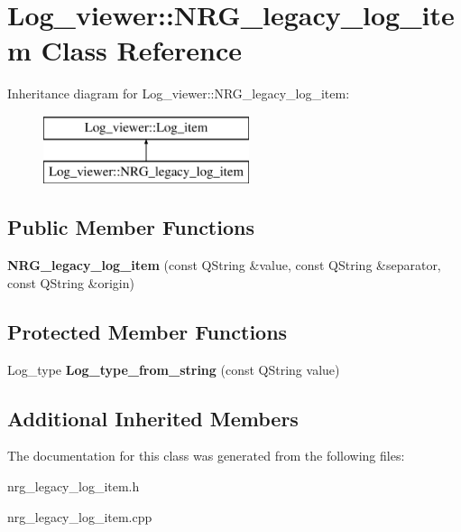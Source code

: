 \hypertarget{class_log__viewer_1_1_n_r_g__legacy__log__item}{\section{Log\-\_\-viewer\-:\-:N\-R\-G\-\_\-legacy\-\_\-log\-\_\-item Class Reference}
\label{class_log__viewer_1_1_n_r_g__legacy__log__item}
}
Inheritance diagram for Log\-\_\-viewer\-:\-:N\-R\-G\-\_\-legacy\-\_\-log\-\_\-item\-:\begin{figure}[H]
\begin{center}
\leavevmode
\includegraphics[height=2.000000cm]{class_log__viewer_1_1_n_r_g__legacy__log__item}
\end{center}
\end{figure}
\subsection*{Public Member Functions}
\begin{DoxyCompactItemize}
\item 
\hypertarget{class_log__viewer_1_1_n_r_g__legacy__log__item_a45bc36e7f11f11f7159f37008ff4791c}{{\bfseries N\-R\-G\-\_\-legacy\-\_\-log\-\_\-item} (const Q\-String \&value, const Q\-String \&separator, const Q\-String \&origin)}\label{class_log__viewer_1_1_n_r_g__legacy__log__item_a45bc36e7f11f11f7159f37008ff4791c}

\end{DoxyCompactItemize}
\subsection*{Protected Member Functions}
\begin{DoxyCompactItemize}
\item 
\hypertarget{class_log__viewer_1_1_n_r_g__legacy__log__item_a6485c7e03d5d0db58fddc76dbb5c190f}{Log\-\_\-type {\bfseries Log\-\_\-type\-\_\-from\-\_\-string} (const Q\-String value)}\label{class_log__viewer_1_1_n_r_g__legacy__log__item_a6485c7e03d5d0db58fddc76dbb5c190f}

\end{DoxyCompactItemize}
\subsection*{Additional Inherited Members}


The documentation for this class was generated from the following files\-:\begin{DoxyCompactItemize}
\item 
nrg\-\_\-legacy\-\_\-log\-\_\-item.\-h\item 
nrg\-\_\-legacy\-\_\-log\-\_\-item.\-cpp\end{DoxyCompactItemize}
